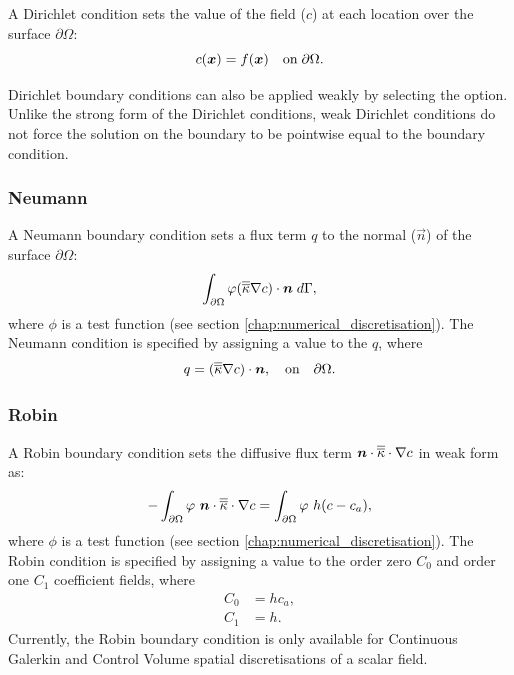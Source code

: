 A Dirichlet condition sets the value of the field ($c$) at each location over the surface $\partial\Omega$:
\begin{equation*}
c({\mbox{\boldmath$x$}}) = f({\mbox{\boldmath$x$}}) \quad \textrm{on}\; \partial\Omega.
\end{equation*}

Dirichlet boundary conditions can also be applied weakly by selecting the 
option. Unlike the strong form of the Dirichlet conditions, weak Dirichlet
conditions do not force the solution on the boundary to be pointwise equal
to the boundary condition.

\subsubsection{Neumann}

A Neumann boundary condition sets a flux term $q$ to the normal ($\vec n$) of the surface $\partial\Omega$:
\begin{equation*}
\int_{\partial\Omega} \varphi (\overline{\overline{\kappa}}\nabla c)\cdot{\mbox{\boldmath$n$}} \;d\Gamma,
\end{equation*}
where $\phi$ is a test function (see section \ref{chap:numerical_discretisation}).
The Neumann condition is specified by assigning a value to the $q$, where
\begin{equation*}
q = (\overline{\overline{\kappa}}\nabla c)\cdot{\mbox{\boldmath$n$}},\quad \textrm{on}\quad \partial\Omega.
\end{equation*}

\subsubsection{Robin}

A Robin boundary condition sets the diffusive flux term  ${\mbox{\boldmath$n$}}\cdot\overline{\overline{\kappa}}\cdot\nabla c$ in weak form as:
\begin{equation*}
- \int_{\partial\Omega} \varphi~{\mbox{\boldmath$n$}}\cdot\overline{\overline{\kappa}}\cdot\nabla c =
    \int_{\partial\Omega} \varphi~h(c-c_{a}),
\end{equation*}
where $\phi$ is a test function (see section \ref{chap:numerical_discretisation}).
The Robin condition is specified by assigning a value to the order zero $C_{0}$ and order one $C_{1}$ coefficient fields, where
\begin{align}
   C_{0} &= hc_{a}, \\
   C_{1} &= h.
\end{align}
Currently, the Robin boundary condition is only available for Continuous Galerkin and Control Volume
spatial discretisations of a scalar field.

